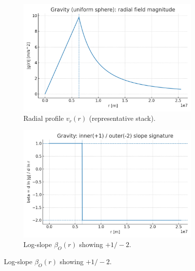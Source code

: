 \documentclass[12pt,a4paper,oneside]{scrreprt}
\begin{document}
\begin{figure}[htbp]\centering
  \begin{subfigure}[t]{0.49\linewidth}
    \includegraphics[width=\linewidth]{gravity_vr_profile.png}
    \caption{Radial profile $v_r(r)$ (representative stack).}
    \label{fig:grav:vr}
  \end{subfigure}\hfill
  \begin{subfigure}[t]{0.49\linewidth}
    \includegraphics[width=\linewidth]{gravity_beta_signature.png}
    \caption{Log-slope $\beta_O(r)$ showing $+1/-2$.}
    \label{fig:grav:beta}
  \end{subfigure}


\end{figure}
\end{document}
